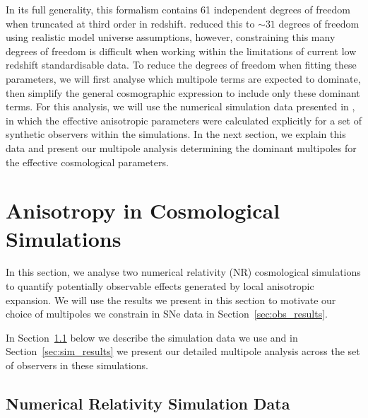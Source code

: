 \documentclass[fleqn,usenatbib]{mnras}
\begin{document}
{In its full generality, this formalism contains 61 independent degrees of freedom when truncated at third order in redshift. \citet{Heinesen_Macpherson_2021_Hubble_flow} reduced this to $\sim 31$ degrees of freedom using realistic model universe assumptions, however, constraining this many degrees of freedom}
{%
is difficult when working within the limitations of current {low redshift standardisable} %
data. To reduce the degrees of freedom when fitting these parameters, we %
{will first} analyse which multipole terms are expected to %
dominate, then simplify {the general cosmographic expression} to include only %
these dominant terms. %
For this analysis, we will use the numerical simulation {data} %
{presented in} \cite{Macpherson_Heinesen_2021}, %
in which the effective anisotropic parameters %
were calculated explicitly for {a set of synthetic} observers within the simulations.}
In the next section, we explain this data and present our multipole analysis determining the dominant multipoles for the effective cosmological parameters. 

\section{Anisotropy in Cosmological Simulations}

In this %
{section,} we analyse {two} {numerical relativity (NR)} {cosmological} simulations 
{to quantify potentially observable} effects generated by local {anisotropic} expansion. 
We will use the results %
{we present in this section} to {motivate} %
our choice of multipoles %
{we constrain} in SNe data {in Section~\ref{sec:obs_results}}. 

In Section~\ref{sec:sims} below we {describe} the simulation data we use and in Section~\ref{sec:sim_results} we present our detailed multipole analysis {across the} %
set of observers in these simulations. 


\subsection{Numerical Relativity Simulation Data}
\label{sec:sims}
 
\end{document}

